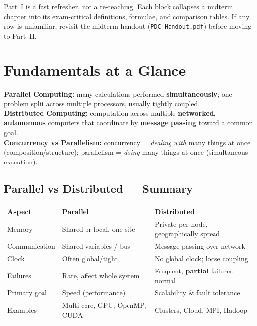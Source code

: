\documentclass[11pt,a4paper]{article}
\begin{document}
\begin{conceptbox}
Part~I is a fast refresher, not a re-teaching. Each block collapses a midterm chapter into its exam-critical definitions, formulae, and comparison tables. If any row is unfamiliar, revisit the midterm handout (\texttt{PDC\_Handout.pdf}) before moving to Part~II.
\end{conceptbox}

\section{Fundamentals at a Glance}

\begin{definitionbox}
\textbf{Parallel Computing:} many calculations performed \textbf{simultaneously}; one problem split across multiple processors, usually tightly coupled.\\[3pt]
\textbf{Distributed Computing:} computation across multiple \textbf{networked, autonomous} computers that coordinate by \textbf{message passing} toward a common goal.\\[3pt]
\textbf{Concurrency vs Parallelism:} concurrency = \emph{dealing with} many things at once (composition/structure); parallelism = \emph{doing} many things at once (simultaneous execution).
\end{definitionbox}

\subsection{Parallel vs Distributed --- Summary}
\begin{longtable}{@{}p{3.6cm}p{5.3cm}p{5.3cm}@{}}
\toprule
\rowcolor{primary!15}
\textbf{Aspect} & \textbf{Parallel} & \textbf{Distributed} \\
\midrule
\endhead
Memory & Shared or local, one site & Private per node, geographically spread \\
Communication & Shared variables / bus & Message passing over network \\
Clock & Often global/tight & No global clock; loose coupling \\
Failures & Rare, affect whole system & Frequent, \textbf{partial} failures normal \\
Primary goal & Speed (performance) & Scalability \& fault tolerance \\
Examples & Multi-core, GPU, OpenMP, CUDA & Clusters, Cloud, MPI, Hadoop \\
\bottomrule
\end{longtable}
\end{document}
